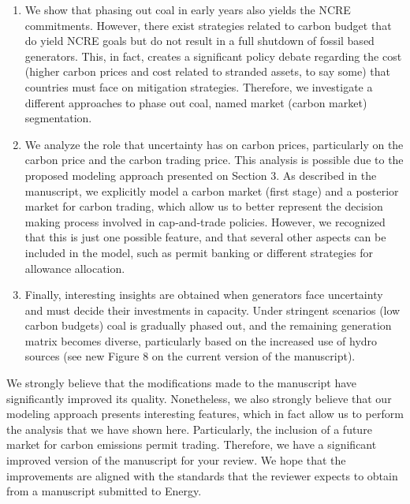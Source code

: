 \documentclass[a4paper]{amsart}
\theoremstyle{plain}
\theoremstyle{definition}
\theoremstyle{remark}
\numberwithin{equation}{section}
\begin{document}
\begin{enumerate}
{{\begin{enumerate}
\begin{enumerate}
	    \item We show that phasing out coal in early years also yields the NCRE commitments. However, there exist strategies related to carbon budget that do yield NCRE goals but do not result in a full shutdown of fossil based generators. This, in fact, creates a significant policy debate regarding the cost (higher carbon prices and cost related to stranded assets, to say some) that countries must face on mitigation strategies. Therefore, we investigate a different approaches to phase out coal, named market (carbon market) segmentation.  
	    \item We analyze the role that uncertainty has on carbon prices, particularly on the carbon price and the carbon trading price. This analysis is possible due to the proposed modeling approach presented on Section 3. As described in the manuscript, we explicitly model a carbon market (first stage) and a posterior market for carbon trading, which allow us to better represent the decision making process involved in cap-and-trade policies. However, we recognized that this is just one possible feature, and that several other aspects can be included in the model, such as permit banking or different strategies for allowance allocation. 
	    \item Finally, interesting insights are obtained when generators face uncertainty and must decide their investments in capacity. Under stringent scenarios (low carbon budgets) coal is gradually phased out, and the remaining generation matrix becomes diverse, particularly based on the increased use of hydro sources (see new Figure 8 on the current version of the manuscript).  
	\end{enumerate}
\end{enumerate}

We strongly believe that the modifications made to the manuscript have significantly improved its quality. Nonetheless, we also strongly believe that our modeling approach presents interesting features, which in fact allow us to perform the analysis that we have shown here. Particularly, the inclusion of a future market for carbon emissions permit trading. Therefore, we have a significant improved version of the manuscript for your review. We hope that the improvements are aligned with the standards that the reviewer expects to obtain from a manuscript submitted to Energy.   

}}


\end{enumerate}
\end{document}
